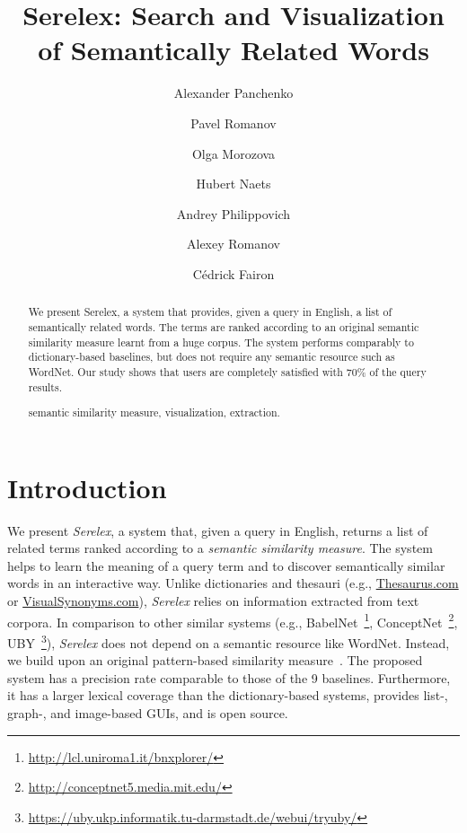 \documentclass[runningheads,a4paper]{llncs}
\newcommand{\keywords}[1]{\par\addvspace\baselineskip
\noindent\keywordname\enspace\ignorespaces#1}
\begin{document}
\mainmatter  

\title{Serelex: Search and Visualization of Semantically Related Words}


\author{Alexander Panchenko \and Pavel Romanov \and Olga Morozova \and Hubert Naets \and Andrey Philippovich \and Alexey Romanov \and C\'{e}drick Fairon}




\toctitle{ \ldots } 
\tocauthor{ \ldots }
\maketitle

\begin{abstract}

We present Serelex, a system that provides, given a query in English, a list of semantically related words. The terms are ranked according to an original semantic similarity measure learnt from a huge corpus. The system performs comparably to dictionary-based baselines, but does not require any semantic resource such as WordNet. Our study shows that users are completely satisfied with  70\% of the query results.     


\keywords{ semantic similarity measure, visualization, extraction.}
\end{abstract}


\section{Introduction}

We present \textit{Serelex}, a system that, given a query in English, returns a list of related terms ranked according to a \textit{semantic similarity measure}. The system helps to learn the meaning of a query term and to discover semantically similar words in an interactive way. Unlike dictionaries and thesauri (e.g., \url{Thesaurus.com} or \url{VisualSynonyms.com}), \textit{Serelex} relies on information extracted from text corpora. In comparison to other similar systems (e.g., BabelNet~\footnote{ \url{http://lcl.uniroma1.it/bnxplorer/}}, ConceptNet~\footnote{ \url{http://conceptnet5.media.mit.edu/}}, UBY~\footnote{\url{https://uby.ukp.informatik.tu-darmstadt.de/webui/tryuby/}}), \textit{Serelex} does not depend on a semantic resource like WordNet. Instead, we build upon an original pattern-based similarity measure~\cite{panchenko2012konvens}. The proposed system
has a precision rate comparable to those of the 9 baselines. Furthermore, it has a larger lexical coverage than the dictionary-based systems, provides list-, graph-, and image-based GUIs, and is open source. 
\end{document}
